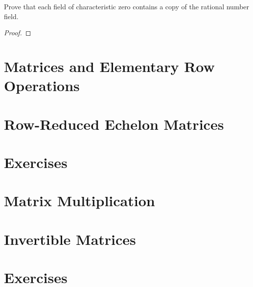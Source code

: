 \begin{exercise}
	Prove that each field of characteristic zero contains a copy of the rational number field.
\end{exercise}

\begin{proof}
\end{proof}

\section{Matrices and Elementary Row Operations}

\section{Row-Reduced Echelon Matrices}

\section*{Exercises}

\section{Matrix Multiplication}

\section{Invertible Matrices}

\section*{Exercises}
